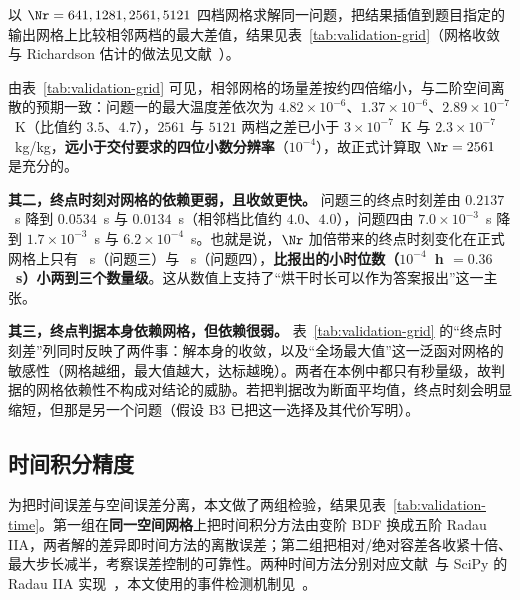 以 $\Nr=641,1281,2561,5121$ 四档网格求解同一问题，把结果插值到题目指定的输出网格上比较相邻两档的最大差值，结果见表~\ref{tab:validation-grid}（网格收敛与 Richardson 估计的做法见文献~\cite{roache1998}）。


由表~\ref{tab:validation-grid} 可见，相邻网格的场量差按约四倍缩小，与二阶空间离散的预期一致：问题一的最大温度差依次为 $4.82\times10^{-6}$、$1.37\times10^{-6}$、$2.89\times10^{-7}$~K（比值约 $3.5$、$4.7$），$2561$ 与 $5121$ 两档之差已小于 $3\times10^{-7}$~K 与 $2.3\times10^{-7}$~kg/kg，\textbf{远小于交付要求的四位小数分辨率}（$10^{-4}$），故正式计算取 $\Nr=2561$ 是充分的。

\textbf{其二，终点时刻对网格的依赖更弱，且收敛更快。} 问题三的终点时刻差由 $0.2137$~s 降到 $0.0534$~s 与 $0.0134$~s（相邻档比值约 $4.0$、$4.0$），问题四由 $7.0\times10^{-3}$~s 降到 $1.7\times10^{-3}$~s 与 $6.2\times10^{-4}$~s。也就是说，$\Nr$ 加倍带来的终点时刻变化在正式网格上只有 \QThreeGridEventDiff~s（问题三）与 \QFourGridEventDiff~s（问题四），\textbf{比报出的小时位数（$10^{-4}$~h $=0.36$~s）小两到三个数量级}。这从数值上支持了``烘干时长可以作为答案报出''这一主张。

\textbf{其三，终点判据本身依赖网格，但依赖很弱。} 表~\ref{tab:validation-grid} 的``终点时刻差''列同时反映了两件事：解本身的收敛，以及``全场最大值''这一泛函对网格的敏感性（网格越细，最大值越大，达标越晚）。两者在本例中都只有秒量级，故判据的网格依赖性不构成对结论的威胁。若把判据改为断面平均值，终点时刻会明显缩短，但那是另一个问题（假设 B3 已把这一选择及其代价写明）。

\subsection{时间积分精度}
\label{sec:timecheck}

为把时间误差与空间误差分离，本文做了两组检验，结果见表~\ref{tab:validation-time}。第一组在\textbf{同一空间网格}上把时间积分方法由变阶 BDF 换成五阶 Radau IIA，两者解的差异即时间方法的离散误差；第二组把相对/绝对容差各收紧十倍、最大步长减半，考察误差控制的可靠性。两种时间方法分别对应文献~\cite{ascher1998}与 SciPy 的 Radau IIA 实现~\cite{scipyradau2026}，本文使用的事件检测机制见~\cite{scipyivp2026}。


